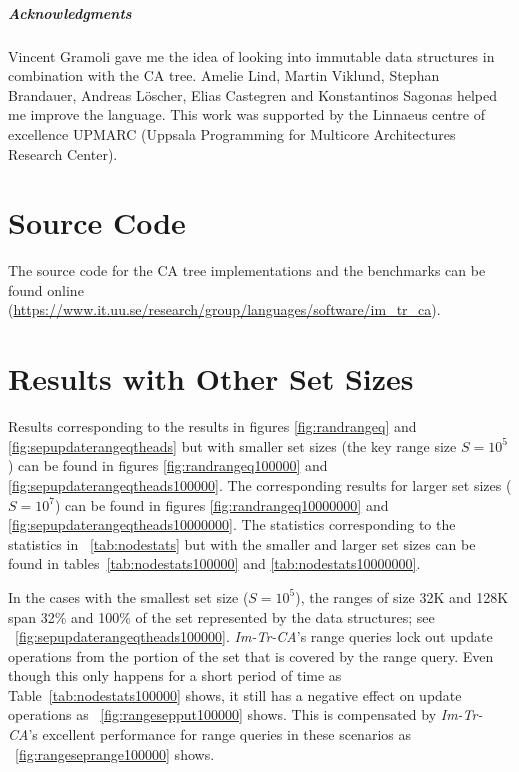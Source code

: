 \documentclass[a4paper,UKenglish]{oasics-v2016}
\begin{document}
\subparagraph*{Acknowledgments}

Vincent Gramoli gave me the idea of looking into immutable data structures in combination with the CA tree.
Amelie Lind, Martin Viklund, Stephan Brandauer, Andreas Löscher, Elias Castegren and Konstantinos Sagonas helped me improve the language.
This work was supported by the Linnaeus centre of excellence UPMARC (Uppsala Programming for Multicore
Architectures Research Center).
 
\appendix
\section{Source Code}
The source code for the CA tree implementations and the benchmarks can be found online (\url{https://www.it.uu.se/research/group/languages/software/im_tr_ca}).

\section{Results with Other Set Sizes}
Results corresponding to the results in figures \ref{fig:randrangeq} and \ref{fig:sepupdaterangeqtheads} but with smaller set sizes (the key range size $S=10^5$) can be found in figures \ref{fig:randrangeq100000} and \ref{fig:sepupdaterangeqtheads100000}.
The corresponding results for larger set sizes ($S=10^7$) can be found in figures \ref{fig:randrangeq10000000} and \ref{fig:sepupdaterangeqtheads10000000}.
The statistics corresponding to the statistics in \tablename~\ref{tab:nodestats} but with the smaller and larger set sizes can be found in tables~\ref{tab:nodestats100000} and \ref{tab:nodestats10000000}.

In the cases with the smallest set size ($S=10^5$), the ranges of size 32K and 128K span 32\% and 100\% of the set represented by the data structures; see \figurename~\ref{fig:sepupdaterangeqtheads100000}.
\emph{Im-Tr-CA}'s range queries lock out update operations from the portion of the set that is covered by the range query.
Even though this only happens for a short period of time as Table~\ref{tab:nodestats100000} shows, it still has a negative effect on update operations as \figurename~\ref{fig:rangesepput100000} shows.
This is compensated by \emph{Im-Tr-CA}'s excellent performance for range queries in these scenarios as \figurename~\ref{fig:rangeseprange100000} shows.
\end{document}
